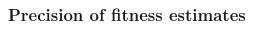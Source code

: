 \begin{multicols}{2}





\subsubsection{Precision of fitness estimates}
\label{sec:cross_plate_validation}



\end{multicols}
